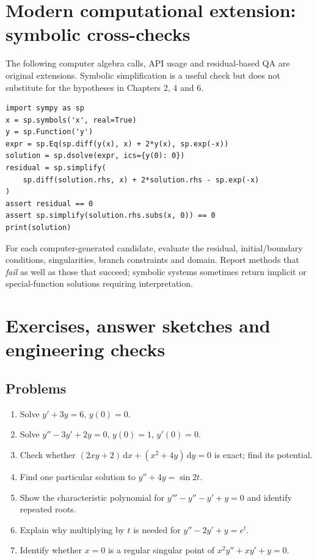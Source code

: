 \documentclass[11pt,letterpaper,oneside]{report}
\theoremstyle{definition}\newtheorem{definition}[theorem]{Definition}
\theoremstyle{remark}\newtheorem{remark}[theorem]{Remark}
\newcommand{\dd}{\,\mathrm{d}}
\begin{document}
\chapter{Modern computational extension: symbolic cross-checks}
\begin{modern}The following computer algebra calls, API usage and residual-based QA are original extensions. Symbolic simplification is a useful check but does not substitute for the hypotheses in Chapters 2, 4 and 6.\end{modern}
\begin{lstlisting}
import sympy as sp
x = sp.symbols('x', real=True)
y = sp.Function('y')
expr = sp.Eq(sp.diff(y(x), x) + 2*y(x), sp.exp(-x))
solution = sp.dsolve(expr, ics={y(0): 0})
residual = sp.simplify(
    sp.diff(solution.rhs, x) + 2*solution.rhs - sp.exp(-x)
)
assert residual == 0
assert sp.simplify(solution.rhs.subs(x, 0)) == 0
print(solution)
\end{lstlisting}
For each computer-generated candidate, evaluate the residual, initial/boundary conditions, singularities, branch constraints and domain. Report methods that \emph{fail} as well as those that succeed; symbolic systems sometimes return implicit or special-function solutions requiring interpretation.
\chapter{Exercises, answer sketches and engineering checks}
\section{Problems}
\begin{enumerate}
\item Solve $y'+3y=6$, $y(0)=0$.
\item Solve $y''-3y'+2y=0$, $y(0)=1$, $y'(0)=0$.
\item Check whether $(2xy+2)\dd x+(x^2+4y)\dd y=0$ is exact; find its potential.
\item Find one particular solution to $y''+4y=\sin2t$.
\item Show the characteristic polynomial for $y'''-y''-y'+y=0$ and identify repeated roots.
\item Explain why multiplying by $t$ is needed for $y''-2y'+y=e^t$.
\item Identify whether $x=0$ is a regular singular point of $x^2y''+xy'+y=0$.
\end{enumerate}
\end{document}
